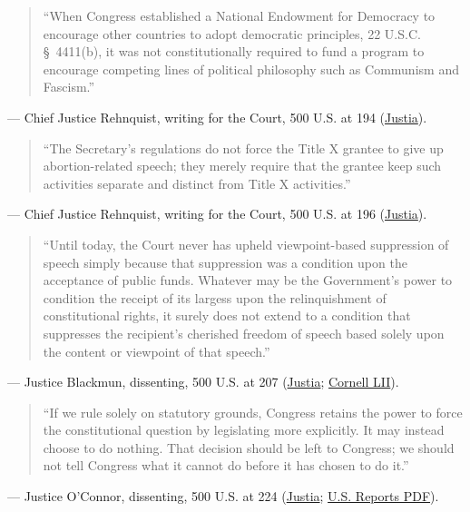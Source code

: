 \documentclass[12pt]{article}
\begin{document}
\begin{quote}
``When Congress established a National Endowment for Democracy to encourage other countries to adopt democratic principles, 22 U.S.C. \S~4411(b), it was not constitutionally required to fund a program to encourage competing lines of political philosophy such as Communism and Fascism.''
\end{quote}
\noindent --- Chief Justice Rehnquist, writing for the Court, 500 U.S. at 194 (\href{https://supreme.justia.com/cases/federal/us/500/173/}{Justia}).

\begin{quote}
``The Secretary's regulations do not force the Title X grantee to give up abortion-related speech; they merely require that the grantee keep such activities separate and distinct from Title X activities.''
\end{quote}
\noindent --- Chief Justice Rehnquist, writing for the Court, 500 U.S. at 196 (\href{https://supreme.justia.com/cases/federal/us/500/173/}{Justia}).

\begin{quote}
``Until today, the Court never has upheld viewpoint-based suppression of speech simply because that suppression was a condition upon the acceptance of public funds. Whatever may be the Government's power to condition the receipt of its largess upon the relinquishment of constitutional rights, it surely does not extend to a condition that suppresses the recipient's cherished freedom of speech based solely upon the content or viewpoint of that speech.''
\end{quote}
\noindent --- Justice Blackmun, dissenting, 500 U.S. at 207 (\href{https://supreme.justia.com/cases/federal/us/500/173/}{Justia}; \href{https://www.law.cornell.edu/supct/html/89-1391.ZD1.html}{Cornell LII}).

\begin{quote}
``If we rule solely on statutory grounds, Congress retains the power to force the constitutional question by legislating more explicitly. It may instead choose to do nothing. That decision should be left to Congress; we should not tell Congress what it cannot do before it has chosen to do it.''
\end{quote}
\noindent --- Justice O'Connor, dissenting, 500 U.S. at 224 (\href{https://supreme.justia.com/cases/federal/us/500/173/}{Justia}; \href{https://tile.loc.gov/storage-services/service/ll/usrep/usrep500/usrep500173/usrep500173.pdf}{U.S. Reports PDF}).
\end{document}
